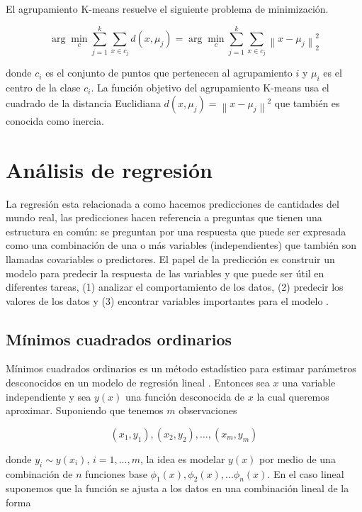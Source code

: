 El agrupamiento K-means resuelve el siguiente problema de minimización. 

\begin{equation}
	\arg \min _{c} \sum_{j=1}^{k} \sum_{x \in c_{j}} d\left(x, \mu_{j}\right)=\arg \min _{c} \sum_{j=1}^{k} \sum_{x \in c_{j}}\left\|x-\mu_{j}\right\|_{2}^{2}
\end{equation}

donde $c_i$ es el conjunto de puntos que pertenecen al agrupamiento $i$ y $\mu_i$ es el centro de la clase $c_i$. La función objetivo del agrupamiento K-means usa el cuadrado de la distancia Euclidiana $d\left(x, \mu_{j}\right)=\left\|x-\mu_{j}\right\|^{2}$ que también es conocida como inercia.

\section{Análisis de regresión}
La regresión esta relacionada a como hacemos predicciones de cantidades del mundo real, las predicciones hacen referencia a preguntas que tienen una estructura en común: se preguntan por una respuesta que puede ser expresada como una combinación de una o más variables (independientes) que también son llamadas covariables o predictores. El papel de la predicción es construir un modelo para predecir la respuesta de las variables y que puede ser útil en diferentes tareas, (1) analizar el comportamiento de los datos, (2) predecir los valores de los datos y (3) encontrar variables importantes para el modelo \cite{igualIntroductionDataScience2017}.
\subsection{Mínimos cuadrados ordinarios}

Mínimos cuadrados ordinarios es un método estadístico para estimar parámetros desconocidos en un modelo de regresión lineal \cite{juarez4toColoquioDepartamento}. Entonces sea $x$ una variable independiente y sea $y(x)$ una función desconocida de $x$ la cual queremos aproximar. Suponiendo que tenemos $m$ observaciones

\[
\left(x_{1}, y_{1}\right),\left(x_{2}, y_{2}\right), \ldots,\left(x_{m}, y_{m}\right)
\]

donde $y_i \sim y(x_i)$, $i=1,...,m$, la idea es modelar $y(x)$ por medio de una combinación de $n$ funciones base $\phi_1(x),\phi_2(x),...\phi_n(x)$. En el caso lineal suponemos que la función se ajusta a los datos en una combinación lineal de la forma 

